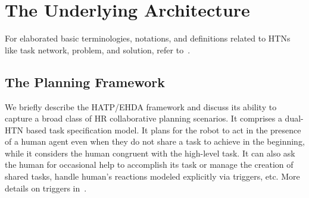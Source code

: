 \documentclass[letterpaper]{article} %
\newtheorem{definition}{Definition}
\begin{document}
\section{The Underlying Architecture} \label{sec:under-framework}
For elaborated basic terminologies, notations, and definitions related to HTNs like task network, problem, and solution, refer to~\cite{naubooks0014222}.  


\subsection{The Planning Framework}
We briefly describe the HATP/EHDA framework and discuss its ability to capture a broad class of HR collaborative planning scenarios. 
It comprises a dual-HTN based task specification model. It plans for the robot to act in the presence of a human agent even when they do not share a task to achieve in the beginning, while it considers the human congruent with the high-level task. 
It can also ask the human for occasional help to accomplish its task or manage the creation of shared tasks, handle human's reactions modeled explicitly via triggers, etc. More details on triggers  in~\cite{ingrand1996prs,AlamiCFGI98}.  
\end{document}
